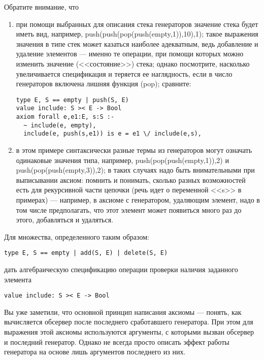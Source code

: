 Обратите внимание, что
\begin{enumerate}
\item при помощи выбранных для описания стека генераторов значение стека будет иметь вид, например, push(push(pop(push(empty,1)),10),1); такое выражения значения в типе стек может казаться наиболее адекватным, ведь добавление и удаление элементов --- именно те операции, при помощи которых можно изменить значение (<<состояние>>) стека; однако посмотрите, насколько увеличивается спецификация и теряется ее наглядность, если в число генераторов включена лишняя функция (pop); сравните:
\begin{lstlisting}
type E, S == empty | push(S, E)
value include: S >< E -> Bool
axiom forall e,e1:E, s:S :-
  ~ include(e, empty),
  include(e, push(s,e1)) is e = e1 \/ include(e,s),
\end{lstlisting}

\item в этом примере синтаксически разные термы из генераторов могут означать одинаковые значения типа, например, push(pop(push(empty,1)),2) и push(pop(push(empty,3)),2); в таких случаях надо быть внимательными при выписывании аксиом: помнить и понимать, сколько разных возможностей есть для рекурсивной части цепочки (речь идет о переменной <<s>> в примерах) --- например, в аксиоме с генератором, удаляющим элемент, надо в том числе предполагать, что этот элемент может появиться много раз до этого, добавляться и удаляться.
\end{enumerate}



\z Для множества, определенного таким образом:
\begin{lstlisting}
type E, S == empty | add(S, E) | delete(S, E)
\end{lstlisting}
дать алгебраическую спецификацию операции проверки наличия заданного элемента
\begin{lstlisting}
value include: S >< E -> Bool
\end{lstlisting}


Вы уже заметили, что основной принцип написания аксиомы --- понять, как вычисляется обсервер после последнего сработавшего генератора. При этом для выражения этой аксиомы используются аргументы, с которыми вызван обсервер и последний генератор. Однако не всегда просто описать эффект работы генератора на основе лишь аргументов последнего из них.

